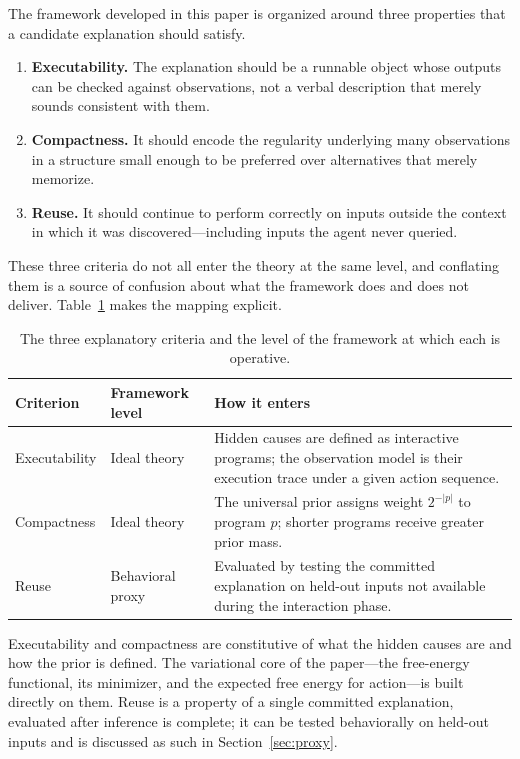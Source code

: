 \documentclass[11pt]{article}
\theoremstyle{remark}
\begin{document}
The framework developed in this paper is organized around three properties that a candidate explanation should satisfy.

\begin{enumerate}
\item \textbf{Executability.} The explanation should be a runnable object whose outputs can be checked against observations, not a verbal description that merely sounds consistent with them.
\item \textbf{Compactness.} It should encode the regularity underlying many observations in a structure small enough to be preferred over alternatives that merely memorize.
\item \textbf{Reuse.} It should continue to perform correctly on inputs outside the context in which it was discovered---including inputs the agent never queried.
\end{enumerate}

These three criteria do not all enter the theory at the same level, and conflating them is a source of confusion about what the framework does and does not deliver. Table~\ref{tab:criteria-levels} makes the mapping explicit.

\begin{table}[h]
\centering
\caption{The three explanatory criteria and the level of the framework at which each is operative.}
\label{tab:criteria-levels}
\begin{tabularx}{\textwidth}{@{}p{}p{}X@{}}
\toprule
\textbf{Criterion} & \textbf{Framework level} & \textbf{How it enters} \\
\midrule
Executability & Ideal theory & Hidden causes are defined as interactive programs; the observation model is their execution trace under a given action sequence. \\
Compactness & Ideal theory & The universal prior assigns weight \(2^{-|p|}\) to program \(p\); shorter programs receive greater prior mass. \\
Reuse & Behavioral proxy & Evaluated by testing the committed explanation on held-out inputs not available during the interaction phase. \\
\bottomrule
\end{tabularx}
\end{table}

Executability and compactness are constitutive of what the hidden causes are and how the prior is defined. The variational core of the paper---the free-energy functional, its minimizer, and the expected free energy for action---is built directly on them. Reuse is a property of a single committed explanation, evaluated after inference is complete; it can be tested behaviorally on held-out inputs and is discussed as such in Section~\ref{sec:proxy}.
\end{document}
